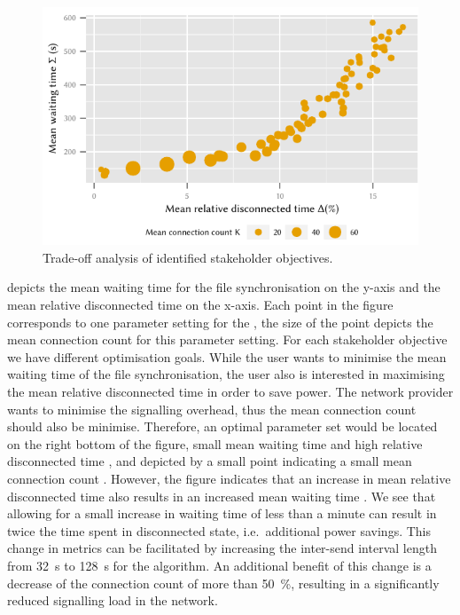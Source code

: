 \begin{figure}
  \centering
  \includegraphics{application/cloud_file_synchronization/numerical_evaluation/figures/summary}
  \caption{Trade-off analysis of identified stakeholder objectives.}
  \label{fig:application:cloud_file_synchronisation:numerical_evaluation:trade_off_analysis:summary}
\end{figure}

 depicts the mean waiting time for the file synchronisation on the y-axis and the mean relative disconnected time on the x-axis.
Each point in the figure corresponds to one parameter setting for the \algointerval, the size of the point depicts the mean connection count \connectionCount for this parameter setting.
For each stakeholder objective we have different optimisation goals.
While the user wants to minimise the mean waiting time \sojournTime of the file synchronisation, the user also is interested in maximising the mean relative disconnected time \relativeDisconnectedTime in order to save power.
The network provider wants to minimise the signalling overhead, thus the mean connection count \connectionCount should also be minimise.
Therefore, an optimal parameter set would be located on the right bottom of the figure, small mean waiting time and high relative disconnected time \relativeDisconnectedTime, and depicted by a small point indicating a small mean connection count \connectionCount.
However, the figure indicates that an increase in mean relative disconnected \relativeDisconnectedTime time also results in an increased mean waiting time \sojournTime.
We see that allowing for a small increase in waiting time \sojournTime of less than a minute can result in twice the time spent in disconnected state, i.e.\ additional power savings.
This change in metrics can be facilitated by increasing the inter-send interval length from \SI{32}{\second} to \SI{128}{\second} for the \algointerval algorithm.
An additional benefit of this change is a decrease of the connection count \relativeDisconnectedTime of more than \SI{50}{\percent}, resulting in a significantly reduced signalling load in the network.
